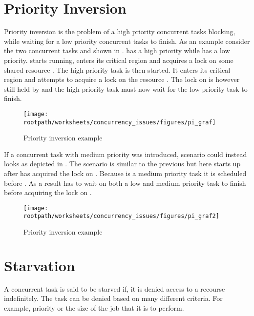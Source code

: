 \section{Priority Inversion}
Priority inversion is the problem of a high priority concurrent tasks blocking, while waiting for a low priority concurrent tasks to finish\cite[p. 456]{tanenbaum2008modern}. As an example consider the two concurrent tasks  and  shown in .  has a high priority while  has a low priority.  starts running, enters its critical region and acquires a lock on some shared resource . The high priority task  is then started. It enters its critical region and attempts to acquire a lock on the resource . The lock on  is however still held by  and the high priority task  must now wait for the low priority task  to finish.

\begin{figure}[htbp]
\centering
 \texttt{[image: \\rootpath/worksheets/concurrency\_issues/figures/pi\_graf]} 
 \caption{Priority inversion example}
\label{fig:priority_inversion}
\end{figure}
If a concurrent task  with medium priority was introduced, scenario could instead looks as depicted in . The scenario is similar to the previous but here  starts up after  has acquired the lock on . Because  is a medium priority task it is scheduled before . As a result  has to wait on both a low and medium priority task to finish before acquiring the lock on .

\begin{figure}[htbp]
\centering
 \texttt{[image: \\rootpath/worksheets/concurrency\_issues/figures/pi\_graf2]} 
 \caption{Priority inversion example}
\label{fig:priority_inversion_m}
\end{figure}

\section{Starvation}
A concurrent task is said to be starved if, it is denied access to a recourse indefinitely\cite[p. 459]{tanenbaum2008modern}. The task can be denied based on many different criteria. For example, priority or the size of the job that it is to perform.

